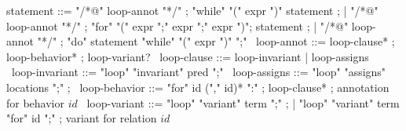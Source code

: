 \begin{syntax}
  statement ::= "/*@" loop-annot "*/" ;
  "while" "(" expr ")" statement ;
  | "/*@" loop-annot "*/" ;
  "for" "(" expr ";" expr ";" expr ")";
  statement ;
  | "/*@" loop-annot "*/" ;
  "do" statement "while" "(" expr ")" ";"
  \
  loop-annot ::= loop-clause* ;
  loop-behavior* ;
  loop-variant?
  \
  loop-clause ::= loop-invariant | loop-assigns 
  \
  loop-invariant ::= "loop" "invariant" pred ";" 
  \
  loop-assigns ::= "loop" "assigns" locations ";" ;
  \
  loop-behavior ::= "for" id ("," id)* ":" ;
  loop-clause* ; annotation for behavior $id$
  \
  loop-variant ::= "loop" "variant" term ";" ;
  | "loop" "variant" term "for" id ";" ; variant for relation $id$
\end{syntax}

